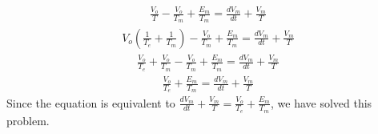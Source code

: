 \documentclass[11pt]{article}
\begin{document}
\begin{enumerate}[label=\arabic*.]
\begin{enumerate}[label=(\alph*)]
\begin{align*}
\end{align*}
\begin{align*}
\frac{V_o} {T} - \frac{V_o} {T_m} + \frac{E_m} {T_m} = \frac{dV_m} {dt} + \frac{V_m} {T}
\end{align*}
\begin{align*}
V_o\left(\frac{1} {T_e} + \frac{1} {T_m}\right) - \frac{V_o} {T_m} + \frac{E_m} {T_m} = \frac{dV_m} {dt} + \frac{V_m} {T}
\end{align*}
\begin{align*}
\frac{V_o} {T_e} + \frac{V_o} {T_m} - \frac{V_o} {T_m} + \frac{E_m} {T_m} = \frac{dV_m} {dt} + \frac{V_m} {T}
\end{align*}
\begin{align*}
\frac{V_o} {T_e} + \frac{E_m} {T_m} = \frac{dV_m} {dt} + \frac{V_m} {T}
\end{align*}
Since the equation is equivalent to $\frac{dV_m} {dt} + \frac{V_m} {T} = \frac{V_o} {T_e} + \frac{E_m} {T_m}$, we have solved this problem.




\end{enumerate}
\end{enumerate}
\end{document}
